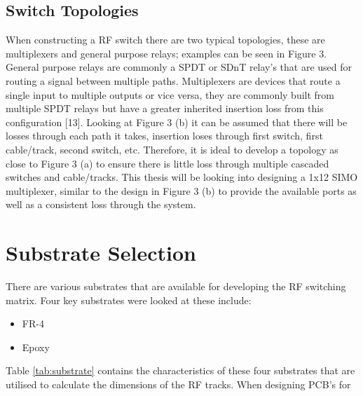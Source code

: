 \documentclass[12pt,openany,a4paper]{book}
\begin{document}
\subsection{Switch Topologies}
When constructing a RF switch there are two typical topologies, these are multiplexers and general purpose relays; examples can be seen in Figure 3. General purpose relays are commonly a SPDT or SDnT relay's that are used for routing a signal between multiple paths. Multiplexers are devices that route a single input to multiple outputs or vice versa, they are commonly built from multiple SPDT relays but have a greater inherited insertion loss from this configuration [13]. 
Looking at Figure 3 (b) it can be assumed that there will be losses through each path it takes, insertion loses through first switch, first cable/track, second switch, etc. Therefore, it is ideal to develop a topology as close to Figure 3 (a) to ensure there is little loss through multiple cascaded switches and cable/tracks. This thesis will be looking into designing a 1x12 SIMO multiplexer, similar to the design in Figure 3 (b) to provide the available ports as well as a consistent loss through the system.




\section{Substrate Selection}
There are various substrates that are available for developing the RF switching matrix. Four key substrates were looked at these include:
\begin{itemize} [noitemsep,topsep=0pt]
  \item FR-4
  \item Epoxy
\end{itemize}
Table \ref{tab:substrate} contains the characteristics of these four substrates that are utilised to calculate the dimensions of the RF tracks. 
When designing PCB's for 
\end{document}
